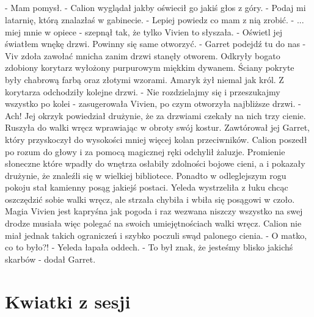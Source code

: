 \documentclass[10pt,twoside,twocolumn]{book}
\begin{document}
\paragraph{}
\indent - Mam pomysł. - Calion wyglądał jakby oświecił go jakiś głos z góry. - Podaj mi latarnię, którą znalazłaś w gabinecie.\newline
\indent - Lepiej powiedz co mam z nią zrobić.\newline
\indent - ... miej mnie w opiece - szepnął tak, że tylko Vivien to słyszała. - Oświetl jej światłem wnękę drzwi. Powinny się same otworzyć.\newline
\indent - Garret podejdź tu do nas - Viv zdoła zawołać mnicha zanim drzwi stanęły otworem. \newline
Odkryły bogato zdobiony korytarz wyłożony purpurowym miękkim dywanem. 
Ściany pokryte były chabrową farbą oraz złotymi wzorami. 
Amaryk  żył niemal jak król. 
Z korytarza odchodziły kolejne drzwi.
\indent - Nie rozdzielajmy się i przeszukajmy wszystko po kolei - zasugerowała Vivien, po czym otworzyła najbliższe drzwi. - Ach!\newline
Jej okrzyk powiedział drużynie, że za drzwiami czekały na nich trzy cienie. 
Ruszyła do walki wręcz wprawiając w obroty swój kostur. 
Zawtórował jej Garret, który przyskoczył do wysokości mniej więcej kolan przeciwników. 
Calion poszedł po rozum do głowy i za pomocą magicznej ręki odchylił żaluzje. 
Promienie słoneczne które wpadły do wnętrza osłabiły zdolności bojowe cieni, a i pokazały drużynie, że znaleźli się w wielkiej bibliotece. 
Ponadto w odleglejszym rogu pokoju stał kamienny posąg jakiejś postaci. 
Yeleda wystrzeliła z łuku chcąc oszczędzić sobie walki wręcz, ale strzała chybiła i wbiła się posągowi w czoło. 
Magia Vivien jest kapryśna jak pogoda i raz wezwana niszczy wszystko na swej drodze musiała więc polegać na swoich umiejętnościach walki wręcz.
Calion nie miał jednak takich ograniczeń i szybko poczuli swąd palonego cienia.\newline
\indent - O matko, co to było?! - Yeleda łapała oddech.\newline
\indent - To był znak, że jesteśmy blisko jakichś skarbów - dodał Garret.

\twocolumn
\normalsize
\chapter{Kwiatki z sesji}

% 
% 
\end{document}
